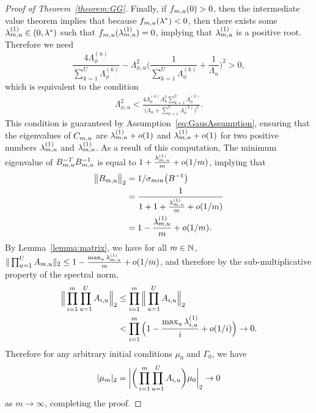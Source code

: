 \documentclass[12pt]{article}\usepackage[]{graphicx}\usepackage[]{xcolor}
\begin{document}
\begin{appendices}
\begin{proof}[Proof of Theorem~\ref{theorem:GG}]
Finally, if $f_{m, u}(0) > 0$, then the intermediate value theorem implies that because $f_{m, u}(\lambda^*) < 0$, then there exists some $\lambda^{(1)}_{m, u} \in (0, \lambda^{*})$ such that $f_{m, u}(\lambda^{(1)}_{m, u}) = 0$, implying that $\lambda^{(1)}_{m, u}$ is a positive root.
Therefore we need
$$
\frac{4\Lambda^{(u)}_{\phi}}{\sum_{k = 1}^U\Lambda^{(k)}_{\phi}} - \Lambda_{\phi, u}^2\bigg(\frac{1}{\sum_{k = 1}^U\Lambda^{(k)}_{\phi}} + \frac{1}{\Lambda_u}\bigg)^2 > 0,
$$
which is equivalent to the condition
\begin{align*}
  \Lambda_{\phi, u}^2 < \frac{4\Lambda^{(u)}_\phi\Lambda^2_{u}\sum_{k = 1}^U \Lambda_{\phi}^{(k)}}{\big(\Lambda_u + \sum_{k = 1}^{U}\Lambda^{(k)}_{\phi}\big)^2}.
\end{align*}
This condition is guaranteed by Assumption~\ref{eq:GausAssumption}, ensuring that the eigenvalues of $C_{m, u}$ are $\lambda^{(1)}_{m, u} + o(1)$ and $\lambda^{(1)}_{m, u} + o(1)$ for two positive numbers $\lambda^{(1)}_{m, u}$ and $\lambda^{(1)}_{m, u}$.
As a result of this computation, The minimum eigenvalue of $B^{-T}_{m, u}B^{-1}_{m, u}$ is equal to $1 + \frac{\lambda^{(1)}_{m, u}}{m} + o(1/m)$, implying that
\begin{align*}
  \big\| B_{m, u}\big\|_2 &= 1 / \sigma_{min}\big(B^{-1} \big) \\
  &= \frac{1}{1 + 1 + \frac{\lambda^{(1)}_{m, u}}{m} + o(1/m)} \\
  &= 1 - \frac{\lambda^{(1)}_{m, u}}{m} + o(1/m).
\end{align*}
By Lemma~\ref{lemma:matrix}, we have for all $m \in \mathbb{N}$, $\|\prod_{u = 1}^U A_{m, u}\|_2 \leq 1 - \frac{\max_u \lambda^{(1)}_{m, u}}{m} + o(1/m)$, and therefore by the sub-multiplicative property of the spectral norm,
\begin{align*}
  \Big\| \prod_{i = 1}^m \prod_{u = 1}^U A_{i, u}\Big\|_2 & \leq \prod_{i = 1}^m \Big\|\prod_{u = 1}^U A_{i, u}\Big\|_2 \\
  &< \prod_{i = 1}^m \Big(1 - \frac{\max_u \lambda^{(1)}_{i, u}}{i} + o(1/i)\Big) \rightarrow 0.
\end{align*}
Therefore for any arbitrary initial conditions $\mu_0$ and $\Gamma_0$, we have
$$|\mu_m|_2 = \bigg|\bigg(\prod_{i = 1}^m\prod_{u = 1}^U A_{i, u}\bigg)\mu_0\bigg|_2 \rightarrow 0$$
as $m\rightarrow \infty$, completing the proof.
\end{proof}


\end{appendices}
\end{document}
